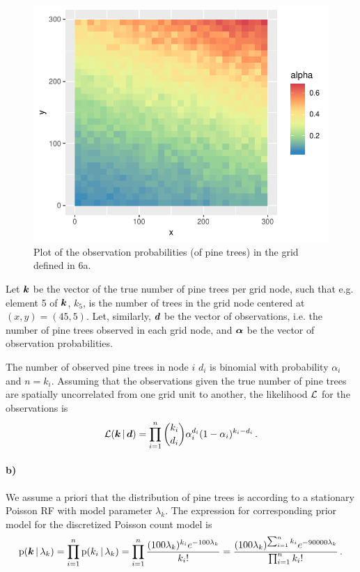 \begin{figure}
    \centering
    \includegraphics{figures/p2_alpha.pdf}
    \caption{Plot of the observation probabilities (of pine trees) in the grid defined in 6a.}
    \label{fig:p2_alpha}
\end{figure}

Let $\bm{k}$ be the vector of the true number of pine trees per grid node, such that e.g. element 5 of $\bm{k}$, $k_5$, is the number of trees in the grid node centered at $(x, y) = (45, 5)$. Let, similarly, $\bm{d}$ be the vector of observations, i.e. the number of pine trees observed in each grid node, and $\bm{\alpha}$ be the vector of observation probabilities.

The number of observed pine trees in node $i$ $d_i$ is binomial with probability $\alpha_i$ and $n = k_i$. Assuming that the observations given the true number of pine trees are spatially uncorrelated from one grid unit to another, the likelihood $\mathcal{L}$ for the observations is
%
\begin{equation*}
    \mathcal{L}(\bm{k} \, | \, \bm{d}) = \prod_{i=1}^n \binom{k_i}{d_i} \alpha_i^{d_i} (1 - \alpha_i)^{k_i - d_i} \, .
\end{equation*}

\paragraph{b)}
We assume a priori that the distribution of pine trees is according to a stationary Poisson RF with model parameter $\lambda_k$. The expression for corresponding prior model for the discretized Poisson count model is
%
\begin{equation*}
    \mathrm{p}(\bm{k} \, | \, \lambda_k) = \prod_{i=1}^n \mathrm{p}(k_i \, | \, \lambda_k) = \prod_{i=1}^n \frac{(100\lambda_k)^{k_i} e^{-100\lambda_k}}{k_i!} = \frac{(100\lambda_k)^{\sum_{i=1}^n k_i} e^{-90000\lambda_k}}{\prod_{i=1}^n k_i!} \, .
\end{equation*}


